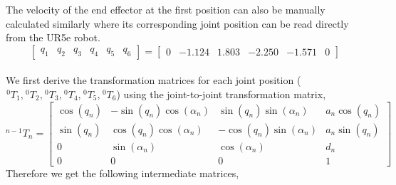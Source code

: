 The velocity of the end effector at the first position can also be manually calculated similarly where its corresponding joint position can be read directly from the UR5e robot.
\begin{equation*}
    \begin{bmatrix} q_1&q_2&q_3&q_4&q_5&q_6 \end{bmatrix} = \begin{bmatrix}0 & -1.124& 1.803 & -2.250 & -1.571 & 0 \end{bmatrix}
\end{equation*}
\\We first derive the transformation matrices for each joint position ($\hspace{1pt} ^{0}T_{1} ,\hspace{1pt} ^{0}T_{2},\hspace{1pt} ^{0}T_{3},\hspace{1pt} ^{0}T_{4},\hspace{1pt} ^{0}T_{5},\hspace{1pt} ^{0}T_{6}$) using the joint-to-joint transformation matrix,
\begin{equation*}
    ^{n-1}T_{n}  = \begin{bmatrix}
        \cos(q_n) & -\sin(q_n)\cos(\alpha_n) & \sin(q_n)\sin(\alpha_n)  & a_n \cos(q_n) \\
        \sin(q_n) & \cos(q_n)\cos(\alpha_n)  & -\cos(q_n)\sin(\alpha_n) & a_n \sin(q_n) \\
        0         & \sin(\alpha_n)           & \cos(\alpha_n)           & d_n           \\
        0         & 0                        & 0                        & 1
    \end{bmatrix}
\end{equation*}
Therefore we get the following intermediate matrices,
